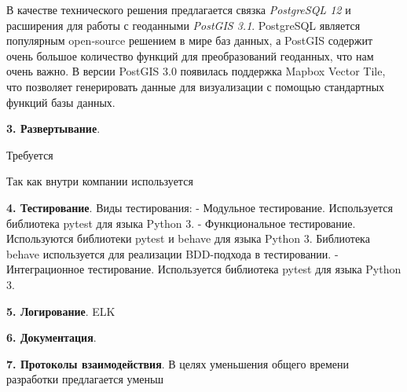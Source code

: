В качестве технического решения предлагается связка \textit{PostgreSQL 12} и расширения для работы с геоданными
\textit{PostGIS 3.1}. PostgreSQL является популярным open-source решением в мире баз данных,
а PostGIS содержит очень большое количество функций для преобразований геоданных, что нам очень важно.
В версии PostGIS 3.0 появилась поддержка Mapbox Vector Tile, что позволяет генерировать данные для визуализации с помощью
стандартных функций базы данных.

\noindent \textbf{3. Развертывание}.

Требуется

Так как внутри компании используется

\noindent \textbf{4. Тестирование}.
Виды тестирования:
- Модульное тестирование. Используется библиотека pytest для языка Python 3.
- Функциональное тестирование. Используются библиотеки pytest и behave для языка Python 3.
Библиотека behave используется для реализации BDD-подхода в тестировании.
- Интеграционное тестирование. Используется библиотека pytest для языка Python 3.

\noindent \textbf{5. Логирование}.
ELK

\noindent \textbf{6. Документация}.


\noindent \textbf{7. Протоколы взаимодействия}.
В целях уменьшения общего времени разработки предлагается уменьш
